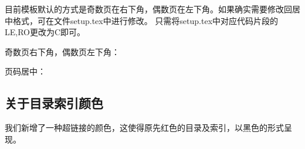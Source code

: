 目前模板默认的方式是奇数页在右下角，偶数页在左下角。如果确实需要修改回居中格式，可在文件setup.tex中进行修改。
只需将setup.tex中对应代码片段的LE,RO更改为C即可。

奇数页右下角，偶数页左下角：
\begin{codeblock}
\fancyfoot [LE,RO] { \thepage }
\end{codeblock}

页码居中：
\begin{codeblock}
\fancyfoot [C] {  \thepage }
\end{codeblock}

\subsection{关于目录索引颜色}
我们新增了一种超链接的颜色，这使得原先红色的目录及索引，以黑色的形式呈现。
